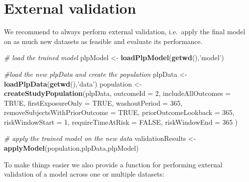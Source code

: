 \documentclass[]{book}
\newenvironment{Shaded}{\begin{snugshade}}{\end{snugshade}}
\newcommand{\KeywordTok}[1]{\textcolor[rgb]{0.13,0.29,0.53}{\textbf{#1}}}
\newcommand{\DataTypeTok}[1]{\textcolor[rgb]{0.13,0.29,0.53}{#1}}
\newcommand{\DecValTok}[1]{\textcolor[rgb]{0.00,0.00,0.81}{#1}}
\newcommand{\StringTok}[1]{\textcolor[rgb]{0.31,0.60,0.02}{#1}}
\newcommand{\CommentTok}[1]{\textcolor[rgb]{0.56,0.35,0.01}{\textit{#1}}}
\newcommand{\OtherTok}[1]{\textcolor[rgb]{0.56,0.35,0.01}{#1}}
\newcommand{\NormalTok}[1]{#1}
\begin{document}
\newpage

\section{External validation}\label{external-validation}

We recommend to always perform external validation, i.e.~apply the final
model on as much new datasets as feasible and evaluate its performance.

\begin{Shaded}
\begin{Highlighting}[]
\CommentTok{# load the trained model}
\NormalTok{plpModel <-}\StringTok{ }\KeywordTok{loadPlpModel}\NormalTok{(}\KeywordTok{getwd}\NormalTok{(),}\StringTok{'model'}\NormalTok{)}

\CommentTok{#load the new plpData and create the population}
\NormalTok{plpData <-}\StringTok{ }\KeywordTok{loadPlpData}\NormalTok{(}\KeywordTok{getwd}\NormalTok{(),}\StringTok{'data'}\NormalTok{)}
\NormalTok{population <-}\StringTok{ }\KeywordTok{createStudyPopulation}\NormalTok{(plpData, }
\DataTypeTok{outcomeId =} \DecValTok{2}\NormalTok{, }
\DataTypeTok{includeAllOutcomes =} \OtherTok{TRUE}\NormalTok{, }
\DataTypeTok{firstExposureOnly =} \OtherTok{TRUE}\NormalTok{, }
\DataTypeTok{washoutPeriod =} \DecValTok{365}\NormalTok{, }
\DataTypeTok{removeSubjectsWithPriorOutcome =} \OtherTok{TRUE}\NormalTok{, }
\DataTypeTok{priorOutcomeLookback =} \DecValTok{365}\NormalTok{,}
\DataTypeTok{riskWindowStart =} \DecValTok{1}\NormalTok{,}
\DataTypeTok{requireTimeAtRisk =} \OtherTok{FALSE}\NormalTok{,}
\DataTypeTok{riskWindowEnd =} \DecValTok{365}
\NormalTok{)}

\CommentTok{# apply the trained model on the new data}
\NormalTok{validationResults <-}\StringTok{ }\KeywordTok{applyModel}\NormalTok{(population,plpData,plpModel)}
\end{Highlighting}
\end{Shaded}

To make things easier we also provide a function for performing external
validation of a model across one or multiple datasets:
\end{document}
